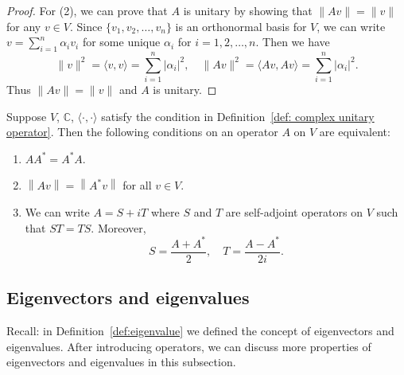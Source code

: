 \documentclass{ctexart}
\newcommand{\C}{\mathbb{C}}
\begin{document}
    \begin{proof}
        For (2), we can prove that $A$ is unitary by showing that $\| Av \| = \|v\|$ for any $v\in V$. Since $ \{v_1, v_2, \ldots, v_n\}$ is an orthonormal basis for $V$, we can write $v = \displaystyle \sum_{i=1}^n \alpha_i v_i$ for some unique $\alpha_i$ for $i=1,2,\ldots,n$. Then we have
        \[
        \| v \|^2 = \langle v, v \rangle = \sum_{i=1}^n |\alpha_i|^2, \quad \| Av \|^2 = \langle Av, Av \rangle = \sum_{i=1}^n |\alpha_i|^2.
        \]
        Thus $\| Av \| = \|v\|$ and $A$ is unitary.
    \end{proof}
    \begin{mypro}
        Suppose $V$, $\C$, $\langle \cdot, \cdot \rangle$ satisfy the condition in Definition~\ref{def: complex unitary operator}. Then the following conditions on an operator $A$ on $V$ are equivalent:
        \begin{enumerate}
            \item $AA^* = A^*A$.
            \item $\left\| Av\right\| = \left\| A^* v\right\|$ for all $v\in V$.
            \item We can write $A=S+iT$ where $S$ and $T$ are self-adjoint operators on $V$ such that $ST=TS$. Moreover,
            $$ S = \frac{A+A^*}{2}, \quad T = \frac{A-A^*}{2i}. $$
        \end{enumerate}
    \end{mypro}

    \subsection{Eigenvectors and eigenvalues}
    Recall: in Definition~\ref{def:eigenvalue} we defined the concept of eigenvectors and eigenvalues. After introducing operators, we can discuss more properties of eigenvectors and eigenvalues in this subsection.
    
\end{document}
